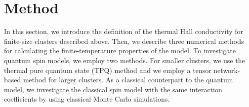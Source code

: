 \documentclass[twocolumn,superscriptaddress,showpacs, longbibliography, aps, prb]{revtex4-2}
\newcommand{\orange}[1]{\textcolor{orange}{#1}}
\begin{document}
\section{Method}
\label{sec:method}
In this section, we %
introduce the definition of
the thermal Hall conductivity for finite-size clusters described above. Then, we %
describe three
numerical methods for calculating the finite-temperature properties of the model. 
To investigate quantum spin models, we employ two methods. 
For smaller clusters, we use the thermal pure quantum state (TPQ) method %
and we employ a tensor network-based method for larger clusters. 
As a %
classical counterpart to the quantum model, 
we investigate the classical spin model with the same interaction coefficients
by using %
classical Monte Carlo simulations. 
\end{document}
